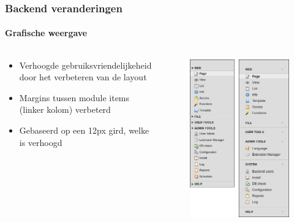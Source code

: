 
\begin{frame}[fragile]
	\frametitle{Backend veranderingen}
	\framesubtitle{Grafische weergave}

	\begin{columns}[T]

		\begin{column}{.5\textwidth}
			\begin{itemize}
				\item Verhoogde gebruiksvriendelijkeheid door het verbeteren van de layout
				\item Margins tussen module items (linker kolom) verbeterd
				\item Gebaseerd op een 12px gird, welke is verhoogd
				\end{itemize}
		\end{column}

		\begin{column}{.5\textwidth}
			\begin{figure}\vspace*{-0.4cm}
				\includegraphics[width=0.6\linewidth]{Images/BackendChanges/VisualAppearance.png}
			\end{figure}
		\end{column}

	\end{columns}

\end{frame}

